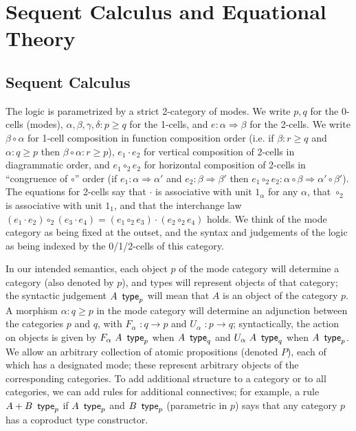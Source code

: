 \documentclass{drl-common/llncs}
\newcommand{\tc}[2]{\ensuremath{#1 \Rightarrow #2}}
\newcommand\compo[2]{\ensuremath{#1 \circ #2}}
\newcommand\compv[2]{\ensuremath{#1 \cdot #2}}
\newcommand\comph[2]{\ensuremath{#1 \mathbin{\circ_2} #2}}
\renewcommand\wftp[2]{\ensuremath{#1 \,\,\, \dsd{type}_{#2}}}
\newcommand\F[2]{\ensuremath{F_{#1} \,\, #2}}
\newcommand\U[2]{\ensuremath{U_{#1} \,\, #2}}
\newcommand\coprd[2]{\ensuremath{#1 + #2}}
\begin{document}
\section{Sequent Calculus and Equational Theory}
\label{sec:rules}

\subsection{Sequent Calculus}

The logic is parametrized by a strict 2-category of modes.  We write
$p,q$ for the 0-cells (modes), $\alpha,\beta,\gamma,\delta : p \ge q$
for the 1-cells, and $e : \tc \alpha \beta$ for the 2-cells.  We write
\compo{\beta}{\alpha} for 1-cell composition in function composition
order (i.e. if $\beta : r \ge q$ and $\alpha : q \ge p$ then
$\compo{\beta}{\alpha} : r \ge p$), \compv{e_1}{e_2} for vertical
composition of 2-cells in diagrammatic order, and \comph{e_1}{e_2} for
horizontal composition of 2-cells in ``congruence of \compo{}{}'' order
(if $e_1 : \tc \alpha {\alpha'}$ and $e_2 : \tc \beta \beta'$ then
$\comph{e_1}{e_2} :
\tc{\compo{\alpha}{\beta}}{\compo{\alpha'}{\beta'}}$).  The equations
for 2-cells say that \compv{}{} is associative with unit $1_\alpha$ for
any $\alpha$, that \comph{}{} is associative with unit $1_1$, and that
the interchange law $\comph{(\compv{e_1}{e_2})}{(\compv{e_3}{e_4})} =
\compv{(\comph{e_1}{e_3})}{(\comph{e_2}{e_4})}$ holds.  We think of the
mode category as being fixed at the outset, and the syntax and
judgements of the logic as being indexed by the 0/1/2-cells of this
category.

In our intended semantics, each object $p$ of the mode category will
determine a category (also denoted by $p$), and types will represent
objects of that category; the syntactic judgement \wftp{A}{p} will
mean that $A$ is an object of the category $p$.  A morphism $\alpha :
q \ge p$ in the mode category will determine an adjunction between the
categories $p$ and $q$, with $\F \alpha {} : q \to p$ and $\U \alpha
{} : p \to q$; syntactically, the action on objects is given by
$\wftp{\F \alpha A}{p}$ when $\wftp{A}{q}$ and $\wftp{\U \alpha A}{q}$
when $\wftp{A}{p}$.  We allow an arbitrary collection of atomic
propositions (denoted $P$), each of which has a designated mode; these
represent arbitrary objects of the corresponding categories.  To add
additional structure to a category or to all categories, we can add
rules for additional connectives; for example, a rule
\wftp{\coprd{A}{B}}{p} if \wftp{A}{p} and \wftp{B}{p} (parametric in
$p$) says that any category $p$ has a coproduct type constructor.
\end{document}
